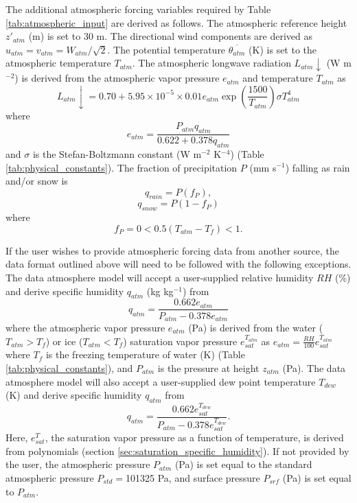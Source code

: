 \documentclass[12pt,authoryear]{elsarticle}
\numberwithin{equation}{section} %
\begin{document}
The additional atmospheric forcing variables required by Table \ref{tab:atmospheric_input} are derived as follows. The atmospheric reference height $z'_{atm}$ (m) is set to 30 m. The directional wind components are derived as $u_{atm}=v_{atm}=W_{atm}/\sqrt{2}$. The potential temperature $\overline{\theta_{atm}}$ (K) is
set to the atmospheric temperature $T_{atm}$. The atmospheric longwave radiation $L_{atm}\downarrow$ (W m$^{-2}$) is derived from the atmospheric vapor pressure $e_{atm}$ and temperature $T_{atm}$ \citet{idsoSetEquationsFull1981} as
\begin{equation}
L_{atm}\downarrow = 0.70+5.95\times 10^{-5} \times 0.01e_{atm}\exp(\frac{1500}{T_{atm}})\sigma T_{atm}^4
\end{equation}
where
\begin{equation}
e_{atm} = \frac{P_{atm}q_{atm}}{0.622+0.378q_{atm}}
\end{equation}
and $\sigma$ is the Stefan-Boltzmann constant (W m$^{-2}$ K$^{-4}$) (Table \ref{tab:physical_constants}). The fraction of precipitation $P$ (mm s$^{-1}$) falling as rain and/or snow is
\begin{equation}
q_{rain} = P(f_{P}),
\end{equation}
\begin{equation}
q_{snow}=P(1-f_{P})
\end{equation}
where
\begin{equation}
f_{P} =0 < 0.5(T_{atm}-T_{f})<1.
\end{equation}

If the user wishes to provide atmospheric forcing data from another source, the data format outlined above will need to be followed with the following exceptions. The data atmosphere model will accept a user-supplied relative humidity $RH$ (\%) and derive specific humidity $q_{atm}$ (kg kg$^{-1}$) from
\begin{equation}
q_{atm}=\frac{0.662e_{atm}}{P_{atm}-0.378e_{atm}}
\end{equation}
where the atmospheric vapor pressure $e_{atm}$ (Pa) is derived from the water ($T_{atm}>T_{f}$) or ice ($T_{atm}<T_{f}$) saturation vapor pressure $e_{sat}^{T_{atm}}$ as $e_{atm}=\frac{RH}{100}e_{sat}^{T_{atm}}$ where $T_{f}$ is the freezing temperature of water (K) (Table \ref{tab:physical_constants}), and $P_{atm}$ is the pressure at height $z_{atm}$ (Pa). The data atmosphere model will also accept a user-supplied dew point temperature $T_{dew}$ (K) and derive specific humidity $q_{atm}$ from 
\begin{equation}
q_{atm}=\frac{0.662e_{sat}^{T_{dew}}}{P_{atm}-0.378e_{sat}^{T_{dew}}}.
\end{equation}
Here, $e_{sat}^{T}$, the saturation vapor pressure as a function of temperature, is derived from \cite{loweApproximatingPolynomialComputation1977} polynomials (section \ref{sec:saturation_specific_humidity}). If not provided by the user, the atmospheric pressure $P_{atm}$ (Pa) is set equal to the standard atmospheric pressure $P_{std}=$101325 Pa, and surface pressure $P_{srf}$ (Pa) is set equal to $P_{atm}$.
\end{document}
